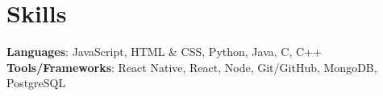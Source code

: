 
\section*{Skills} 
  \resumeSubHeadingListStart
    \small{\item{

      \textbf{Languages}{: JavaScript, HTML \& CSS, Python, Java, C, C++ } \\
        \textbf{Tools/Frameworks}{: React Native, React, Node, Git/GitHub, MongoDB, PostgreSQL} \\
    }}
  \resumeSubHeadingListEnd


